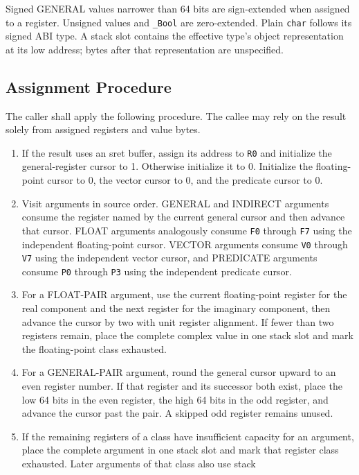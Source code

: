 \documentclass[10pt,twoside]{article}
\begin{document}
Signed GENERAL values narrower than 64 bits are sign-extended when assigned to
a register. Unsigned values and \texttt{\_Bool} are zero-extended. Plain
\texttt{char} follows its signed ABI type. A stack slot contains the effective
type's object representation at its low address; bytes after that
representation are unspecified.

\subsection{Assignment Procedure}
The caller shall apply the following procedure. The callee may rely on the
result solely from assigned registers and value bytes.

\begin{enumerate}[leftmargin=1.35em,itemsep=3pt,topsep=3pt]
\item If the result uses an sret buffer, assign its address to \texttt{R0} and
initialize the general-register cursor to 1. Otherwise initialize it to 0.
Initialize the floating-point cursor to 0, the vector cursor to 0, and the
predicate cursor to 0.
\item Visit arguments in source order. GENERAL and INDIRECT arguments consume
the register named by the current general cursor and then advance that cursor.
FLOAT arguments analogously consume \texttt{F0} through \texttt{F7} using the
independent floating-point cursor. VECTOR arguments consume \texttt{V0}
through \texttt{V7} using the independent vector cursor, and PREDICATE
arguments consume \texttt{P0} through \texttt{P3} using the independent
predicate cursor.
\item For a FLOAT-PAIR argument, use the current floating-point register for
the real component and the next register for the imaginary component, then
advance the cursor by two with unit register alignment. If fewer than two
registers remain, place the complete complex value in one stack
slot and mark the floating-point class exhausted.
\item For a GENERAL-PAIR argument, round the general cursor upward to an even
register number. If that register and its successor both exist, place the low
64 bits in the even register, the high 64 bits in the odd register, and advance
the cursor past the pair. A skipped odd register remains unused.
\item If the remaining registers of a class have insufficient capacity for an
argument, place the complete argument in one stack slot and mark
that register class exhausted. Later arguments of that class also use stack

\end{enumerate}
\end{document}
